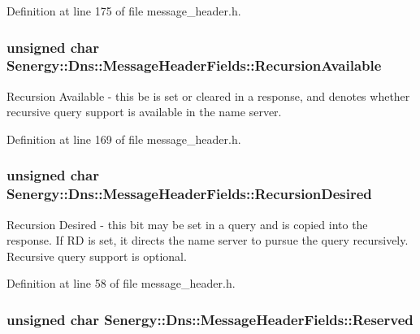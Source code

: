 Definition at line 175 of file message\-\_\-header.\-h.

\hypertarget{struct_senergy_1_1_dns_1_1_message_header_fields_afbb68b60a28f855e64eb13615fc2633e}{
\subsubsection[{Recursion\-Available}]{\setlength{\rightskip}{0pt plus 5cm}unsigned char Senergy\-::\-Dns\-::\-Message\-Header\-Fields\-::\-Recursion\-Available}}\label{struct_senergy_1_1_dns_1_1_message_header_fields_afbb68b60a28f855e64eb13615fc2633e}


Recursion Available -\/ this be is set or cleared in a response, and denotes whether recursive query support is available in the name server. 



Definition at line 169 of file message\-\_\-header.\-h.

\hypertarget{struct_senergy_1_1_dns_1_1_message_header_fields_ab5d7c8933016bb7288462b4a0ac131a5}{
\subsubsection[{Recursion\-Desired}]{\setlength{\rightskip}{0pt plus 5cm}unsigned char Senergy\-::\-Dns\-::\-Message\-Header\-Fields\-::\-Recursion\-Desired}}\label{struct_senergy_1_1_dns_1_1_message_header_fields_ab5d7c8933016bb7288462b4a0ac131a5}


Recursion Desired -\/ this bit may be set in a query and is copied into the response. If R\-D is set, it directs the name server to pursue the query recursively. Recursive query support is optional. 



Definition at line 58 of file message\-\_\-header.\-h.

\hypertarget{struct_senergy_1_1_dns_1_1_message_header_fields_afb988d15085d4f740df367d1792440c7}{
\subsubsection[{Reserved}]{\setlength{\rightskip}{0pt plus 5cm}unsigned char Senergy\-::\-Dns\-::\-Message\-Header\-Fields\-::\-Reserved}}\label{struct_senergy_1_1_dns_1_1_message_header_fields_afb988d15085d4f740df367d1792440c7}



